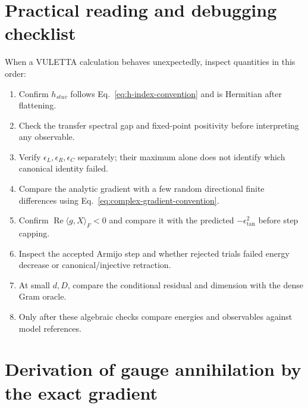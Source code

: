 \documentclass[11pt]{article}
\newcommand{\RePart}{\operatorname{Re}}
\begin{document}
\section{Practical reading and debugging checklist}
\label{sec:checklist}

When a VULETTA calculation behaves unexpectedly, inspect quantities in this
order:
\begin{enumerate}
  \item Confirm $h_{stuv}$ follows Eq.~\eqref{eq:h-index-convention} and is
        Hermitian after flattening.
  \item Check the transfer spectral gap and fixed-point positivity before
        interpreting any observable.
  \item Verify $\epsilon_L,\epsilon_R,\epsilon_C$ separately; their maximum
        alone does not identify which canonical identity failed.
  \item Compare the analytic gradient with a few random directional finite
        differences using Eq.~\eqref{eq:complex-gradient-convention}.
  \item Confirm $\RePart\langle g,X\rangle_F<0$ and compare it with the
        predicted $-\epsilon_{\mathrm{tan}}^2$ before step capping.
  \item Inspect the accepted Armijo step and whether rejected trials failed
        energy decrease or canonical/injective retraction.
  \item At small $d,D$, compare the conditional residual and dimension with
        the dense Gram oracle.
  \item Only after these algebraic checks compare energies and observables
        against model references.
\end{enumerate}

\section{Derivation of gauge annihilation by the exact gradient}
\label{app:gauge-annihilation}
\end{document}
